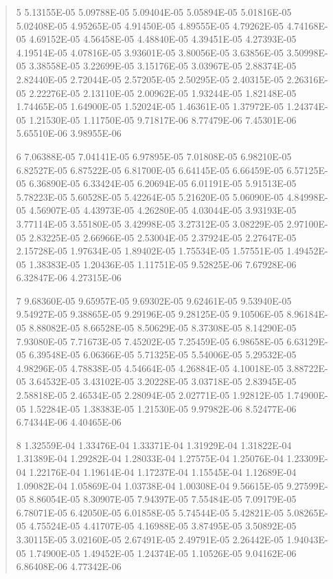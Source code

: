 \documentclass[letterpaper,10pt,english]{sphinxmanual}
\begin{document}
\begin{quote}
\begin{DUlineblock}{0em}
\begin{DUlineblock}{\DUlineblockindent}
\item[] 5   5.13155E-05  5.09788E-05  5.09404E-05  5.05894E-05  5.01816E-05  5.02408E-05  4.95265E-05  4.91450E-05  4.89555E-05  4.79262E-05  4.74168E-05  4.69152E-05  4.56458E-05  4.48840E-05  4.39451E-05  4.27393E-05  4.19514E-05  4.07816E-05  3.93601E-05  3.80056E-05  3.63856E-05  3.50998E-05  3.38558E-05  3.22699E-05  3.15176E-05  3.03967E-05  2.88374E-05  2.82440E-05  2.72044E-05  2.57205E-05  2.50295E-05  2.40315E-05  2.26316E-05  2.22276E-05  2.13110E-05  2.00962E-05  1.93244E-05  1.82148E-05  1.74465E-05  1.64900E-05  1.52024E-05  1.46361E-05  1.37972E-05  1.24374E-05  1.21530E-05  1.11750E-05  9.71817E-06  8.77479E-06  7.45301E-06  5.65510E-06  3.98955E-06
\item[] 6   7.06388E-05  7.04141E-05  6.97895E-05  7.01808E-05  6.98210E-05  6.82527E-05  6.87522E-05  6.81700E-05  6.64145E-05  6.66459E-05  6.57125E-05  6.36890E-05  6.33424E-05  6.20694E-05  6.01191E-05  5.91513E-05  5.78223E-05  5.60528E-05  5.42264E-05  5.21620E-05  5.06090E-05  4.84998E-05  4.56907E-05  4.43973E-05  4.26280E-05  4.03044E-05  3.93193E-05  3.77114E-05  3.55180E-05  3.42998E-05  3.27312E-05  3.08229E-05  2.97100E-05  2.83225E-05  2.66966E-05  2.53004E-05  2.37924E-05  2.27647E-05  2.15728E-05  1.97634E-05  1.89402E-05  1.75534E-05  1.57551E-05  1.49452E-05  1.38383E-05  1.20436E-05  1.11751E-05  9.52825E-06  7.67928E-06  6.32847E-06  4.27315E-06
\item[] 7   9.68360E-05  9.65957E-05  9.69302E-05  9.62461E-05  9.53940E-05  9.54927E-05  9.38865E-05  9.29196E-05  9.28125E-05  9.10506E-05  8.96184E-05  8.88082E-05  8.66528E-05  8.50629E-05  8.37308E-05  8.14290E-05  7.93080E-05  7.71673E-05  7.45202E-05  7.25459E-05  6.98658E-05  6.63129E-05  6.39548E-05  6.06366E-05  5.71325E-05  5.54006E-05  5.29532E-05  4.98296E-05  4.78838E-05  4.54664E-05  4.26884E-05  4.10018E-05  3.88722E-05  3.64532E-05  3.43102E-05  3.20228E-05  3.03718E-05  2.83945E-05  2.58818E-05  2.46534E-05  2.28094E-05  2.02771E-05  1.92812E-05  1.74900E-05  1.52284E-05  1.38383E-05  1.21530E-05  9.97982E-06  8.52477E-06  6.74344E-06  4.40465E-06
\item[] 8   1.32559E-04  1.33476E-04  1.33371E-04  1.31929E-04  1.31822E-04  1.31389E-04  1.29282E-04  1.28033E-04  1.27575E-04  1.25076E-04  1.23309E-04  1.22176E-04  1.19614E-04  1.17237E-04  1.15545E-04  1.12689E-04  1.09082E-04  1.05869E-04  1.03738E-04  1.00308E-04  9.56615E-05  9.27599E-05  8.86054E-05  8.30907E-05  7.94397E-05  7.55484E-05  7.09179E-05  6.78071E-05  6.42050E-05  6.01858E-05  5.74544E-05  5.42821E-05  5.08265E-05  4.75524E-05  4.41707E-05  4.16988E-05  3.87495E-05  3.50892E-05  3.30115E-05  3.02160E-05  2.67491E-05  2.49791E-05  2.26442E-05  1.94043E-05  1.74900E-05  1.49452E-05  1.24374E-05  1.10526E-05  9.04162E-06  6.86408E-06  4.77342E-06

\end{DUlineblock}
\end{DUlineblock}
\end{quote}
\end{document}
